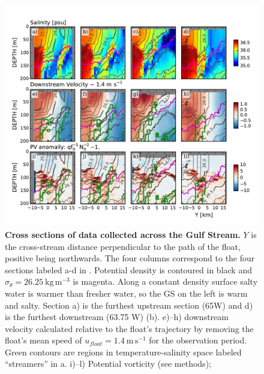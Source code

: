 \documentclass{article}
\begin{document}
\begin{figure}[htbp]
  \centering
    \includegraphics[width=\textwidth]{./SalDFirstStreamer.pdf}
    \caption{{\bf Cross sections of data collected across the Gulf Stream.}   $Y$ is the cross-stream distance perpendicular to the path of the float, positive being northwards.  The four columns correspond to the  four sections labeled a-d in . Potential density is contoured in black and $\sigma_{\theta}=26.25\ \mathrm{kg\,m^{-3}}$ is magenta.  Along a constant density surface salty water is warmer than fresher water, so the GS on the left is warm and salty.  Section a) is the furthest upstream section (65W) and d) is the furthest downstream (63.75 W) (b).  e)--h) downstream velocity calculated relative to the float's trajectory by removing the float's mean speed of $u_{float}=1.4\ \mathrm{m\,s^{-1}}$ for the observation period.   Green contours are regions in temperature-salinity space labeled ``streamers'' in a.  i)--l) Potential vorticity (see methods);
 } \label{fig:SalDFirstStreamer}
\end{figure}
\end{document}

